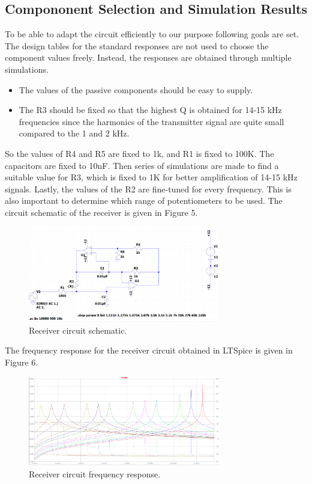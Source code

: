 \documentclass[letterpaper,12pt]{article}
\begin{document}
\subsection{Compononent Selection and Simulation Results}
To be able to adapt the circuit efficiently to our purpose following goals are set. The design tables for the standard responses are not used to choose the component values freely. Instead, the responses are obtained through multiple simulations.
\begin{itemize}
    \item The values of the passive components should be easy to supply.
    \item The R3 should be fixed so that the highest Q is obtained for 14-15 kHz frequencies since the harmonics of the transmitter signal are quite small compared to the 1 and 2 kHz.
\end{itemize}
So the values of R4 and R5 are fixed to 1k, and R1 is fixed to 100K. The capacitors are fixed to 10nF. Then series of simulations are made to find a suitable value for R3, which is fixed to 1K for better amplification of 14-15 kHz signals. Lastly, the values of the R2 are fine-tuned for every frequency. This is also important to determine which range of potentiometers to be used. The circuit schematic of the receiver is given in Figure 5.
\begin{figure}[H]
    \centering
    \includegraphics[width = 0.75\textwidth]{receiver_schematic.png}
    \caption{Receiver circuit schematic.}
\end{figure}

The frequency response for the receiver circuit obtained in LTSpice is given in Figure 6.
\begin{figure}[H]
    \centering
    \includegraphics[width = 0.75\textwidth]{response.png}
    \caption{Receiver circuit frequency response.}
\end{figure}
\end{document}
